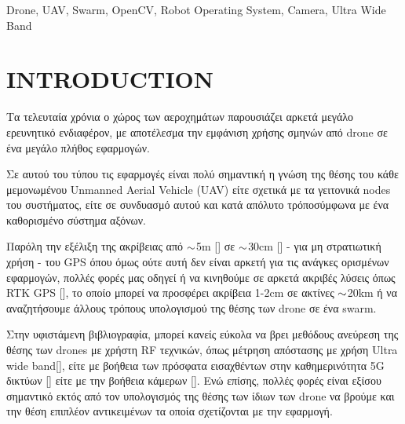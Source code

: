 \begin{abstract}
Η συγκεκριμένη διπλωματική ε\-ργα\-σία έχει στόχο την επίτευξη 
υπολογισμού θέσης - στον τρισδιάστατο χώρο - ενός πρότυπου α\-ντι\-κειμένου, 
από ένα σμήνος drone\udot με όσο δυνατόν χαμηλότερο κόστος υλικού ανά node του 
συστήματος. Ιδανικά θα γίνει προσπάθεια να γίνει multi sensor data fusion 
και να αξιοποιηθούν πληροφορίες τόσο με βάση image-based τεχνικών υπολογισμού, 
όπως επίσης και RF-based.
\end{abstract}
  
\begin{keywords}
Drone, UAV, Swarm, OpenCV, Robot Operating System, Camera, Ultra Wide Band
\end{keywords}

\section{INTRODUCTION}
Τα τελευταία χρόνια ο χώρος των αεροχημάτων παρουσιάζει αρκετά μεγάλο ερευνητικό 
ενδιαφέρον, με αποτέλεσμα την εμφάνιση χρήσης σμηνών από drone σε ένα μεγάλο
πλήθος εφαρμογών. 

Σε αυτού του τύπου τις εφαρμογές είναι πολύ σημαντική η γνώση της θέσης του κάθε 
μεμονωμένου Unmanned Aerial Vehicle (UAV) είτε σχετικά με τα γειτονικά nodes του 
συστήματος, είτε σε συ\-νδυα\-σμό αυτού και κατά απόλυτο τρόπο\udot σύμφωνα με ένα 
καθορισμένο σύστημα αξόνων.

Παρόλη την εξέλιξη της ακρίβειας από $\small \sim$5m [\cite{1}] 
σε $\small \sim$30cm [\cite{2}] - για μη στρατιωτική χρήση - του GPS\udot 
όπου όμως ούτε αυτή δεν είναι αρκετή για τις ανάγκες ορισμένων εφαρμογών, 
πολλές φορές μας οδηγεί ή να κινηθούμε σε αρκετά ακριβές 
λύσεις όπως RTK GPS [\cite{3}], το οποίο μπορεί να προσφέρει ακρίβεια 1-2cm σε 
ακτίνες $\small \sim$20km ή να αναζητήσουμε άλλους τρόπους υπολογισμού της θέσης
των drone σε ένα swarm.

Στην υφιστάμενη βιβλιογραφία, μπορεί κανείς εύκολα να βρει μεθόδους ανεύρεση της θέσης  
των drones με χρήστη RF τεχνικών, όπως μέτρηση απόστασης με 
χρήση Ultra wide band[\cite{4}], είτε με βοήθεια των πρόσφατα εισαχθέντων στην καθημερινότητα
5G δικτύων [\cite{5}] είτε με την βοήθεια κάμερων [\cite{6}]. Ενώ επίσης, πολλές φορές είναι
εξίσου σημαντικό εκτός από τον υπολογισμός της θέσης των ίδιων των drone να βρούμε και την
θέση επιπλέον αντικειμένων τα οποία σχετίζονται με την εφαρμογή.

